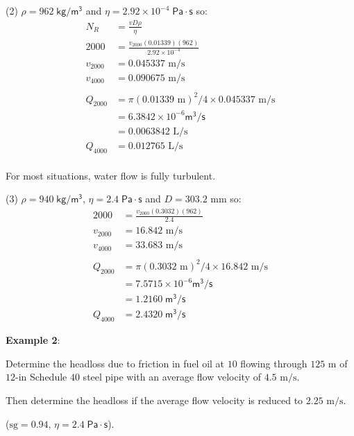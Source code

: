 \documentclass[10pt]{amsart}
\begin{document}
  	\par\vfill\newpage
	(2)
	$\rho=962\;\mathsf{kg/m^3}$ and $ \eta=2.92\times 10^{-4}\;\mathsf{Pa\cdot s}$ so:
  	\begin{align*}
  		N_R &= \frac{vD\rho}{\eta}\\
  		2000 &= \frac{v_{2000}(0.01339)(962)}{2.92\times10^{-4}}\\
  		v_{2000} &= 0.045337\text{ m/s}\\
  		v_{4000} &= 0.090675\text{ m/s}\\\\
  		Q_{2000} &= \pi(0.01339\text{ m})^2/4\times 0.045337\text{ m/s}\\
  			&= 6.3842\times10^{-6}\mathsf{m^3/s}\\
  			&= 0.0063842\text{ L/s}\\
  			Q_{4000} &= 0.012765\text{ L/s}\\
  	\end{align*}
  	
  	For most situations, water flow is fully turbulent.
  	\par\bigskip
  	
  	(3)
  	$\rho=940\;\mathsf{kg/m^3}$, $ \eta=2.4\;\mathsf{Pa\cdot s}$ and $D=303.2\text{ mm}$ so:
  	\begin{align*}
  		2000 &= \frac{v_{2000}(0.3032)(962)}{2.4}\\
  		v_{2000} &= 16.842\text{ m/s}\\
  		v_{4000} &= 33.683\text{ m/s}\\\\
  		Q_{2000} &= \pi(0.3032\text{ m})^2/4\times 16.842\text{ m/s}\\
  			&= 7.5715\times10^{-6}\mathsf{m^3/s}\\
  			&= 1.2160\;\mathsf{m^3/s}\\
  			Q_{4000} &= 2.4320\;\mathsf{m^3/s}
  	\end{align*}
  	
  	\vfill\newpage
\Large

	\textbf{Example 2}:
	
		Determine the headloss due to friction in fuel oil at $10$\textcelsius{} flowing through $125\text{ m}$ 
			of $12$-in Schedule $40$ steel pipe with an average flow velocity of $4.5\text{ m/s}$. \par\medskip
			Then determine the headloss if the average flow velocity is reduced to $2.25\text{ m/s}$.\par\medskip 
			($\text{sg}=0.94$, $\eta=2.4\;\mathsf{Pa\cdot s}$).\par\medskip
\end{document}
